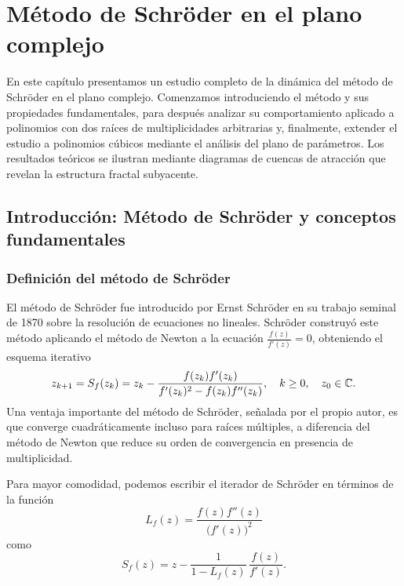 \chapter{Método de Schröder en el plano complejo}
\label{cap:schroder_plano_complejo}

En este capítulo presentamos un estudio completo de la dinámica del método de Schröder en el plano complejo. Comenzamos introduciendo el método y sus propiedades fundamentales, para después analizar su comportamiento aplicado a polinomios con dos raíces de multiplicidades arbitrarias y, finalmente, extender el estudio a polinomios cúbicos mediante el análisis del plano de parámetros. Los resultados teóricos se ilustran mediante diagramas de cuencas de atracción que revelan la estructura fractal subyacente.

\section{Introducción: Método de Schröder y conceptos fundamentales}

\subsection{Definición del método de Schröder}

El método de Schröder fue introducido por Ernst Schröder en su trabajo seminal de 1870 \cite{Sch} sobre la resolución de ecuaciones no lineales. Schröder construyó este método aplicando el método de Newton a la ecuación $\tfrac{f(z)}{f'(z)}=0$, obteniendo el esquema iterativo
\begin{equation}
 z_{k+1}=S_f(z_k)=z_k-\frac{f(z_k)f'(z_k)}{f'(z_k)^2-f(z_k)f''(z_k)}, \quad k\ge 0, \quad z_0\in\mathbb{C}.
 \label{eq:Sch_def}
\end{equation}
Una ventaja importante del método de Schröder, señalada por el propio autor, es que converge cuadráticamente incluso para raíces múltiples, a diferencia del método de Newton que reduce su orden de convergencia en presencia de multiplicidad.

Para mayor comodidad, podemos escribir el iterador de Schröder en términos de la función
\begin{equation}
 L_f(z)=\frac{f(z)f''(z)}{\big(f'(z)\big)^2}
 \label{eq:Lf_def}
\end{equation}
como
\begin{equation}
 S_f(z)=z-\frac{1}{1-L_f(z)}\,\frac{f(z)}{f'(z)}.
 \label{eq:Sch_real}
\end{equation}

